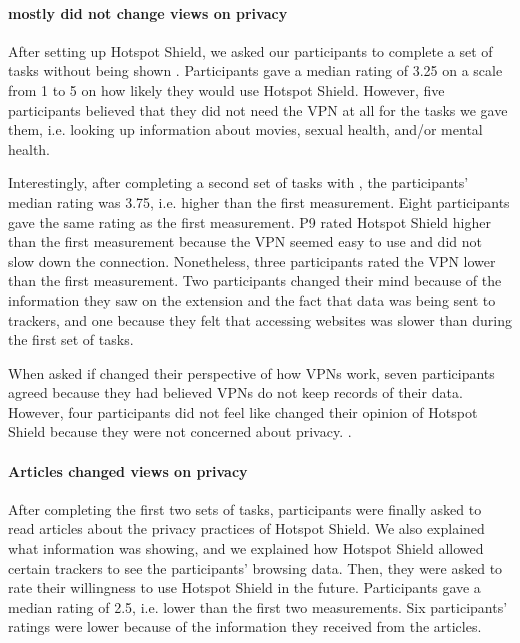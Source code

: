 \paragraph{\tool mostly did not change views on privacy}

After setting up Hotspot Shield, we asked our participants to complete a set of tasks without being shown \tool. Participants gave a median rating of 3.25 on a scale
from 1 to 5 on how likely they would use Hotspot Shield. However, five participants believed that they did not need the VPN at all for the tasks we gave them, i.e. looking up information about movies, sexual health, and/or mental health. 

Interestingly, after completing a second set of tasks with \tool, the participants' median rating was 3.75, i.e. higher than the first measurement. Eight participants gave the same rating as the first measurement. P9 rated Hotspot Shield higher than the first measurement because the VPN seemed easy to use and did not slow down the connection. Nonetheless, three participants rated the VPN lower than the
first measurement. Two participants changed their mind because of the information they saw on the extension and the fact that data was being sent to trackers, and one because
they felt that accessing websites was slower than during the first set of
tasks.

When asked if \tool changed their perspective of how VPNs work, seven
participants agreed because they had believed VPNs do not keep records of their data.  However, four participants did not feel like \tool changed their opinion of Hotspot Shield because they were not concerned about privacy. .

\paragraph{Articles changed views on privacy}

After completing the first two sets of tasks, participants were finally asked to read articles
about the privacy practices of Hotspot Shield. We also explained what information \tool was showing, and we explained how Hotspot Shield allowed certain trackers to see the participants' browsing data. Then, they were asked to rate
their willingness to use Hotspot Shield in the future. Participants gave a median rating
of 2.5, i.e. lower than the first two measurements. Six participants' ratings were
lower because of the information they received from the articles.

